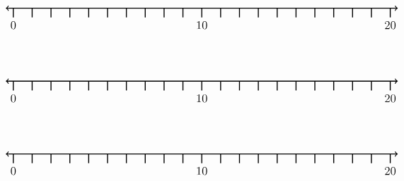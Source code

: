 \documentclass[leqno, 12pt]{article}
\begin{document}
\vspace{10pt}\begin{equation}
    \begin{tikzpicture}[scale=0.67, baseline={([yshift=-1pt]current bounding box.north)}]
        \draw[{To[scale=1.3]}-{To[scale=1.3]}, line width=1pt] (-0.4, 0) -- (20.4, 0);
        \foreach \x in {0,1,...,20}
            \draw[shift={(\x,0)},color=black, line width=1pt] (0pt,-14pt) -- (0pt,0pt);
        \foreach \x in {0,10,20}
            \draw[shift={(\x,-0.8)},color=black] node[font=\large,text height=12pt] {$\x$};
        \node [font=\large, anchor=east] at (25,1.65) {$  $};
    \end{tikzpicture}
\end{equation}
\vspace{10pt}\begin{equation}
    \begin{tikzpicture}[scale=0.67, baseline={([yshift=-1pt]current bounding box.north)}]
        \draw[{To[scale=1.3]}-{To[scale=1.3]}, line width=1pt] (-0.4, 0) -- (20.4, 0);
        \foreach \x in {0,1,...,20}
            \draw[shift={(\x,0)},color=black, line width=1pt] (0pt,-14pt) -- (0pt,0pt);
        \foreach \x in {0,10,20}
            \draw[shift={(\x,-0.8)},color=black] node[font=\large,text height=12pt] {$\x$};
        \node [font=\large, anchor=east] at (25,1.65) {$  $};
    \end{tikzpicture}
\end{equation}
\vspace{10pt}\begin{equation}
    \begin{tikzpicture}[scale=0.67, baseline={([yshift=-1pt]current bounding box.north)}]
        \draw[{To[scale=1.3]}-{To[scale=1.3]}, line width=1pt] (-0.4, 0) -- (20.4, 0);
        \foreach \x in {0,1,...,20}
            \draw[shift={(\x,0)},color=black, line width=1pt] (0pt,-14pt) -- (0pt,0pt);
        \foreach \x in {0,10,20}
            \draw[shift={(\x,-0.8)},color=black] node[font=\large,text height=12pt] {$\x$};
        \node [font=\large, anchor=east] at (25,1.65) {$  $};
    \end{tikzpicture}
\end{equation}
\end{document}
